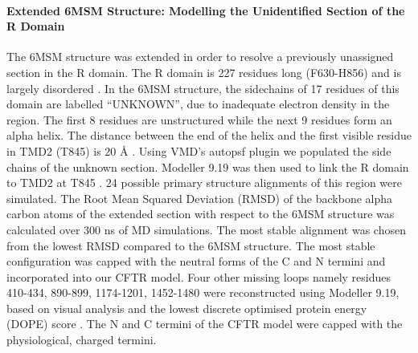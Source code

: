 \paragraph{Extended 6MSM Structure: Modelling the Unidentified Section of the R Domain} The 6MSM structure was extended in order to resolve a previously unassigned section in the R domain. The R domain is 227 residues long (F630-H856) and is largely disordered \cite{bozoky2013}. In the 6MSM structure, the sidechains of 17 residues of this domain are labelled “UNKNOWN”, due to inadequate electron density in the region. The first 8 residues are unstructured while the next 9 residues form an alpha helix. The distance between the end of the helix and the first visible residue in TMD2 (T845) is 20 $\mbox{\AA}$ \cite{zhang2018a}. Using VMD’s autopsf plugin \cite{humphrey1996} we populated the side chains of the unknown section. Modeller 9.19 was then used to link the R domain to TMD2 at T845 \cite{sali1993}. 24 possible primary structure alignments of this region were simulated. The Root Mean Squared Deviation (RMSD) of the backbone alpha carbon atoms of the extended section with respect to the 6MSM structure was calculated over 300 ns of MD simulations. The most stable alignment was chosen from the lowest RMSD compared to the 6MSM structure. The most stable configuration was capped with the neutral forms of the C and N termini and incorporated into our CFTR model. Four other missing loops namely residues 410-434, 890-899, 1174-1201, 1452-1480 were reconstructed using Modeller 9.19, based on visual analysis and the lowest discrete optimised protein energy (DOPE) score \cite{shen2006}. The N and C termini of the CFTR model were capped with the physiological, charged termini.

